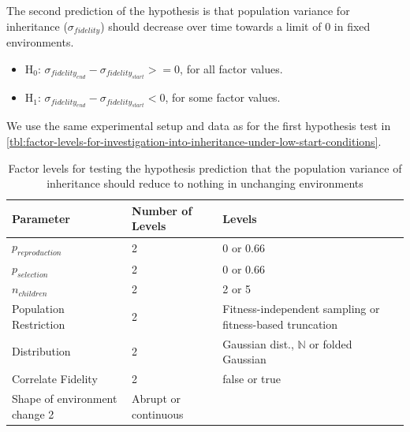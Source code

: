 
The second prediction of the hypothesis is that population variance for inheritance ($\sigma_{fidelity}$) should decrease over time towards a limit of $0$ in fixed environments.

\begin{itemize}[label={}]
	\item H$_0$: $\sigma_{fidelity_{end}}-\sigma_{fidelity_{start}} >= 0$, for all factor values.
	\item H$_1$: $\sigma_{fidelity_{end}}-\sigma_{fidelity_{start}} < 0$, for some factor values.
\end{itemize}

We use the same experimental setup and data as for the first hypothesis test in \cref{tbl:factor-levels-for-investigation-into-inheritance-under-low-start-conditions}.



\begin{table} %
	\begin{center}
		\caption{Factor levels for testing the hypothesis prediction that the population variance of inheritance should reduce to nothing in unchanging environments}
		\begin{tabular}{@{}llp{6cm}@{}}
			\toprule
			Parameter              & Number of Levels & Levels                                                   \\
			\midrule
			$p_{reproduction}$     & 2                & 0 or 0.66                                                \\
			$p_{selection}$        & 2                & 0 or 0.66                                                \\
			$n_{children}$         & 2                & 2 or 5                                                   \\
			Population Restriction & 2                & Fitness-independent sampling or fitness-based truncation \\
			Distribution           & 2                & Gaussian dist., $\mathbb{N}$ or folded Gaussian          \\
			Correlate Fidelity     & 2                & false or true                                            \\
			Shape of environment change		2&	Abrupt or continuous\\
			\bottomrule
		\end{tabular}
	\end{center}
\end{table}

